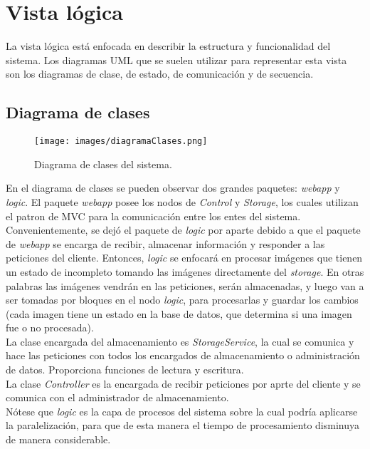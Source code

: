 \documentclass{scrreprt}
\begin{document}
\chapter{Vista lógica}

La vista lógica está enfocada en describir la estructura y funcionalidad del sistema. Los diagramas UML que se suelen utilizar para representar esta vista son los diagramas de clase, de estado, de comunicación y de secuencia.\\

\section{Diagrama de clases}

\begin{figure}[H]
	\centering
    \texttt{[image: images/diagramaClases.png]}
    \caption{Diagrama de clases del sistema.}\label{diaClases}
\end{figure}

En el diagrama de clases se pueden observar dos grandes paquetes: \textit{webapp} y \textit{logic}. El paquete \textit{webapp} posee los nodos de \textit{Control} y \textit{Storage}, los cuales utilizan el patron de MVC para la comunicación entre los entes del sistema. Convenientemente, se dejó el paquete de \textit{logic} por aparte debido a que el paquete de \textit{webapp} se encarga de recibir, almacenar información y responder a las peticiones del cliente. Entonces, \textit{logic} se enfocará en procesar imágenes que tienen un estado de incompleto tomando las imágenes directamente del \textit{storage}. En otras palabras las imágenes vendrán en las peticiones, serán almacenadas, y luego van a ser tomadas por bloques en el nodo \textit{logic}, para procesarlas y guardar los cambios (cada imagen tiene un estado en la base de datos, que determina si una imagen fue o no procesada).\\

La clase encargada del almacenamiento es \textit{StorageService},  la cual se comunica y hace las peticiones con todos los encargados de almacenamiento o administración de datos. Proporciona funciones de lectura y escritura.\\

La clase \textit{Controller} es la encargada de recibir peticiones por aprte del cliente y se comunica con el administrador de almacenamiento.\\

Nótese que \textit{logic} es la capa de procesos del sistema sobre la cual podría aplicarse la paralelización, para que de esta manera el tiempo de procesamiento disminuya de manera considerable.\\
\end{document}
